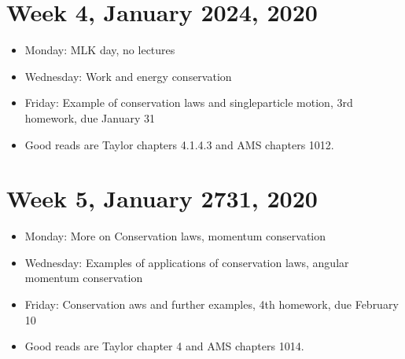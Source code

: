 \documentclass[letterpaper,10pt,english]{sphinxmanual}
\begin{document}
\section{Week 4, January 20\sphinxhyphen{}24, 2020}
\label{\detokenize{intro:week-4-january-20-24-2020}}\begin{itemize}
\item {} 
Monday: MLK day, no lectures

\item {} 
Wednesday: Work and energy conservation

\item {} 
Friday:  Example of conservation laws and single\sphinxhyphen{}particle motion, 3rd homework, due January 31

\item {} 
Good reads are Taylor chapters 4.1\sphinxhyphen{}.4.3 and AMS chapters 10\sphinxhyphen{}12.

\end{itemize}


\section{Week 5, January 27\sphinxhyphen{}31, 2020}
\label{\detokenize{intro:week-5-january-27-31-2020}}\begin{itemize}
\item {} 
Monday: More on Conservation laws, momentum conservation

\item {} 
Wednesday: Examples of applications of conservation laws, angular momentum conservation

\item {} 
Friday:  Conservation aws and further examples, 4th homework, due February 10

\item {} 
Good reads are Taylor chapter 4 and AMS chapters 10\sphinxhyphen{}14.

\end{itemize}
\end{document}
